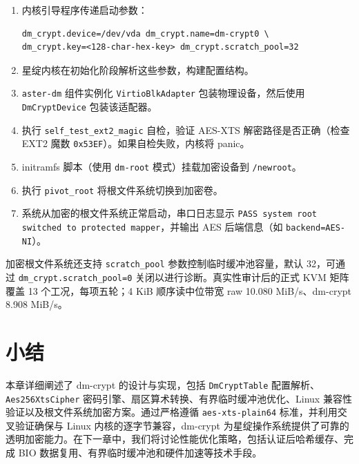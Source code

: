 \begin{enumerate}
    \item 内核引导程序传递启动参数：
        \begin{lstlisting}[basicstyle=\ttfamily\small]
dm_crypt.device=/dev/vda dm_crypt.name=dm-crypt0 \
dm_crypt.key=<128-char-hex-key> dm_crypt.scratch_pool=32
        \end{lstlisting}
    \item 星绽内核在初始化阶段解析这些参数，构建配置结构。
    \item \texttt{aster-dm} 组件实例化 \texttt{VirtioBlkAdapter} 包装物理设备，然后使用 \texttt{DmCryptDevice} 包装该适配器。
    \item 执行 \texttt{self\_test\_ext2\_magic} 自检，验证 AES-XTS 解密路径是否正确（检查 EXT2 魔数 \texttt{0x53EF}）。如果自检失败，内核将 panic。
    \item initramfs 脚本（使用 \texttt{dm-root} 模式）挂载加密设备到 \texttt{/newroot}。
    \item 执行 \texttt{pivot\_root} 将根文件系统切换到加密卷。
    \item 系统从加密的根文件系统正常启动，串口日志显示 \texttt{PASS system root switched to protected mapper}，并输出 AES 后端信息（如 \texttt{backend=AES-NI}）。
\end{enumerate}

加密根文件系统还支持 \texttt{scratch\_pool} 参数控制临时缓冲池容量，默认 32，可通过 \texttt{dm\_crypt.scratch\_pool=0} 关闭以进行诊断。真实性审计后的正式 KVM 矩阵覆盖 13 个工况，每项五轮；4 KiB 顺序读中位带宽 raw 10.080 MiB/s、dm-crypt 8.908 MiB/s。

\section{小结}

本章详细阐述了 dm-crypt 的设计与实现，包括 \texttt{DmCryptTable} 配置解析、\texttt{Aes256\allowbreak XtsCipher} 密码引擎、扇区算术转换、有界临时缓冲池优化、Linux 兼容性验证以及根文件系统加密方案。通过严格遵循 \texttt{aes-xts-plain64} 标准，并利用交叉验证确保与 Linux 内核的逐字节兼容，dm-crypt 为星绽操作系统提供了可靠的透明加密能力。在下一章中，我们将讨论性能优化策略，包括认证后哈希缓存、完成 BIO 数据复用、有界临时缓冲池和硬件加速等技术手段。